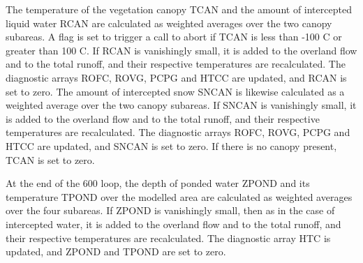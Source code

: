 The temperature of the vegetation canopy T\+C\+A\+N and the amount of intercepted liquid water R\+C\+A\+N are calculated as weighted averages over the two canopy subareas. A flag is set to trigger a call to abort if T\+C\+A\+N is less than -\/100 C or greater than 100 C. If R\+C\+A\+N is vanishingly small, it is added to the overland flow and to the total runoff, and their respective temperatures are recalculated. The diagnostic arrays R\+O\+F\+C, R\+O\+V\+G, P\+C\+P\+G and H\+T\+C\+C are updated, and R\+C\+A\+N is set to zero. The amount of intercepted snow S\+N\+C\+A\+N is likewise calculated as a weighted average over the two canopy subareas. If S\+N\+C\+A\+N is vanishingly small, it is added to the overland flow and to the total runoff, and their respective temperatures are recalculated. The diagnostic arrays R\+O\+F\+C, R\+O\+V\+G, P\+C\+P\+G and H\+T\+C\+C are updated, and S\+N\+C\+A\+N is set to zero. If there is no canopy present, T\+C\+A\+N is set to zero.

At the end of the 600 loop, the depth of ponded water Z\+P\+O\+N\+D and its temperature T\+P\+O\+N\+D over the modelled area are calculated as weighted averages over the four subareas. If Z\+P\+O\+N\+D is vanishingly small, then as in the case of intercepted water, it is added to the overland flow and to the total runoff, and their respective temperatures are recalculated. The diagnostic array H\+T\+C is updated, and Z\+P\+O\+N\+D and T\+P\+O\+N\+D are set to zero.

